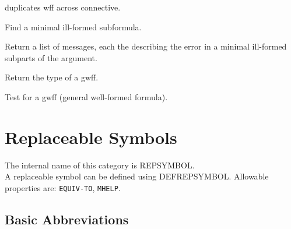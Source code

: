\begin{description} 
\item[DUPW]  
duplicates wff across connective.

\item[EDILL]  
Find a minimal ill-formed subformula.

\item[ILL]  
Return a list of messages, each the describing the error
in a minimal ill-formed subparts of the argument.

\item[TP]  
Return the type of a gwff.

\item[WFFP]  
Test for a gwff (general well-formed formula).
\item
\end{description}
\chapter{Replaceable Symbols}
The internal name of this category is 
REPSYMBOL.\\
A replaceable symbol can be defined using DEFREPSYMBOL.
Allowable properties are: \texttt{EQUIV-TO}, \texttt{MHELP}.

\section{Basic Abbreviations}

